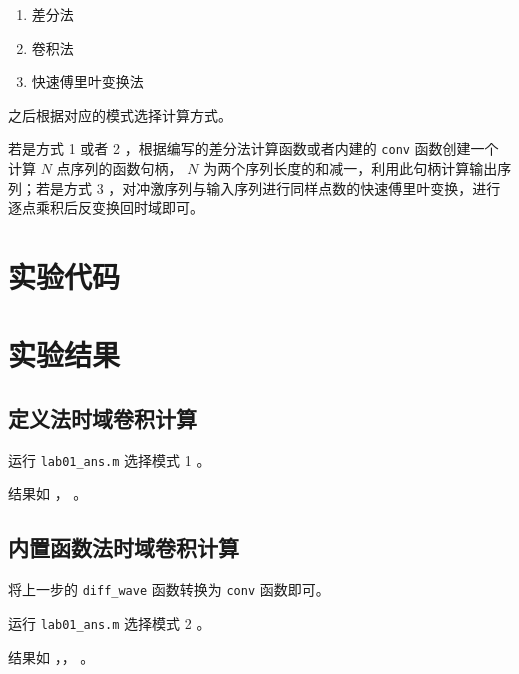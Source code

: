 \documentclass[lang=cn,11pt,a4paper,cite=authoryear]{elegantpaper}
\begin{document}
\begin{enumerate}
    \item 差分法
    \item 卷积法
    \item 快速傅里叶变换法
\end{enumerate}

之后根据对应的模式选择计算方式。

若是方式 1 或者 2 ，根据编写的差分法计算函数或者内建的 \lstinline{conv} 函数创建一个计算 \(N\) 点序列的函数句柄， \(N\) 为两个序列长度的和减一，利用此句柄计算输出序列；若是方式 3 ，对冲激序列与输入序列进行同样点数的快速傅里叶变换，进行逐点乘积后反变换回时域即可。

\section{实验代码}







\section{实验结果}

\subsection{定义法时域卷积计算}

运行 \lstinline{lab01_ans.m} 选择模式 1 。

结果如 ， 。




\subsection{内置函数法时域卷积计算}

将上一步的 \lstinline{diff_wave} 函数转换为 \lstinline{conv} 函数即可。

运行 \lstinline{lab01_ans.m} 选择模式 2 。

结果如 ，， 。
\end{document}
